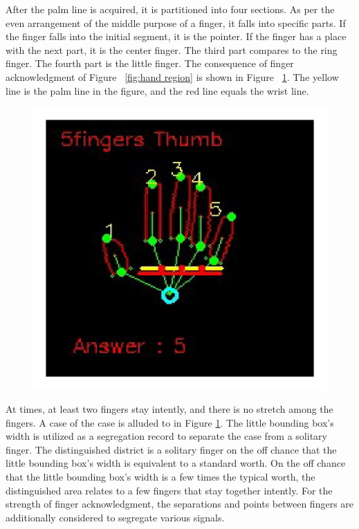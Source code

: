 \documentclass[a4paper]{article}
\begin{document}
After the palm line is acquired, it is partitioned into four sections. As per the even arrangement of the middle purpose of a finger, it falls into specific parts. If the finger falls into the initial segment, it is the pointer. If the finger has a place with the next part, it is the center finger. The third part compares to the ring finger. The fourth part is the little finger. The consequence of finger acknowledgment of Figure ~\ref{fig:hand region} is shown in Figure ~\ref{fig:The recognition of the fingers.}. The yellow line is the palm line in the figure, and the red line equals the wrist line.

\begin{figure}[h!]
\begin{center}
\includegraphics[scale=1.5]{Fig11}
\label{fig:The recognition of the fingers.}
\end{center}
\end{figure}

At times, at least two fingers stay intently, and there is no stretch among the fingers. A case of the case is alluded to in Figure \ref{fig:The recognition of the fingers.}. The little bounding box's width is utilized as a segregation record to separate the case from a solitary finger. The distinguished district is a solitary finger on the off chance that the little bounding box's width is equivalent to a standard worth. On the off chance that the little bounding box's width is a few times the typical worth, the distinguished area relates to a few fingers that stay together intently. For the strength of finger acknowledgment, the separations and points between fingers are additionally considered to segregate various signals.
\end{document}
